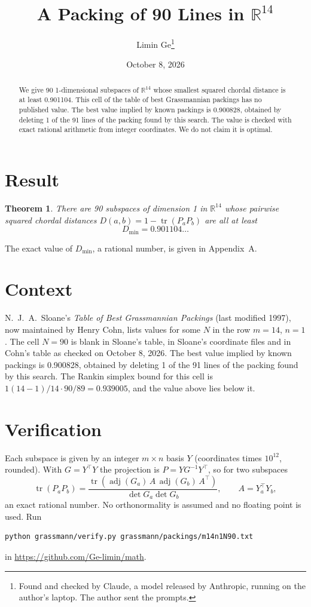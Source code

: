 \documentclass[11pt,a4paper]{article}
\title{A Packing of 90 Lines in $\mathbb{R}^{14}$}
\author{Limin Ge\thanks{Found and checked by Claude, a model released by Anthropic, running on the author's laptop. The author sent the prompts.}}
\date{October 8, 2026}
\newtheorem*{theorem}{Theorem}
\begin{document}
\maketitle
\begin{abstract}
We give 90 1-dimensional subspaces of $\mathbb{R}^{14}$ whose smallest squared chordal distance is at least 0.901104. This cell of the table of best Grassmannian packings has no published value. The best value implied by known packings is 0.900828, obtained by deleting 1 of the 91 lines of the packing found by this search. The value is checked with exact rational arithmetic from integer coordinates. We do not claim it is optimal.
\end{abstract}

\section{Result}
\begin{theorem}
There are 90 subspaces of dimension 1 in $\mathbb{R}^{14}$ whose pairwise squared chordal distances $D(a,b) = 1 - \operatorname{tr}(P_aP_b)$ are all at least
\[ D_{\min} = 0.901104\ldots \]
\end{theorem}
The exact value of $D_{\min}$, a rational number, is given in Appendix~A.


\section{Context}
N.~J.~A.~Sloane's \emph{Table of Best Grassmannian Packings} (last modified 1997), now maintained by Henry Cohn, lists values for some $N$ in the row $m=14$, $n=1$. The cell $N=90$ is blank in Sloane's table, in Sloane's coordinate files and in Cohn's table as checked on October 8, 2026. The best value implied by known packings is 0.900828, obtained by deleting 1 of the 91 lines of the packing found by this search. The Rankin simplex bound for this cell is $1(14-1)/14\cdot 90/89 = 0.939005$, and the value above lies below it.


\section{Verification}
Each subspace is given by an integer $m\times n$ basis $Y$ (coordinates times $10^{12}$, rounded). With $G=Y^\top Y$ the projection is $P=YG^{-1}Y^\top$, so for two subspaces
\[ \operatorname{tr}(P_aP_b)=\frac{\operatorname{tr}(\operatorname{adj}(G_a)\,A\,\operatorname{adj}(G_b)\,A^\top)}{\det G_a\det G_b},\qquad A=Y_a^\top Y_b, \]
an exact rational number. No orthonormality is assumed and no floating point is used. Run
\begin{verbatim}
python grassmann/verify.py grassmann/packings/m14n1N90.txt
\end{verbatim}
in \url{https://github.com/Ge-limin/math}.
\end{document}
